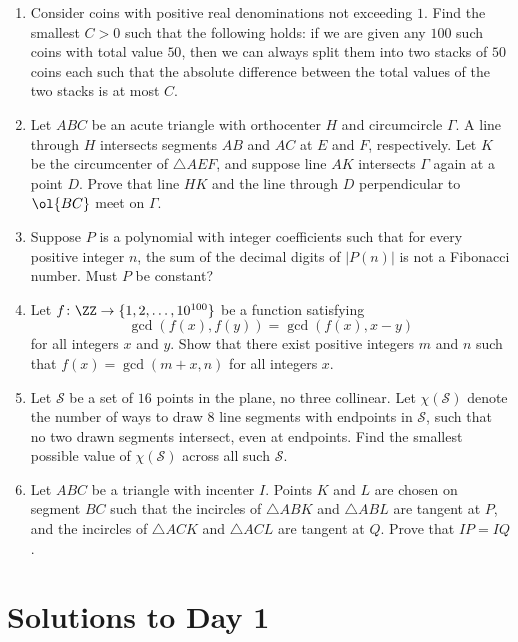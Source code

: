 \documentclass[11pt]{scrartcl}
\begin{document}
\begin{enumerate}[\bfseries 1.]
\item %
Consider coins with positive real denominations not exceeding $1$.
Find the smallest $C>0$ such that the following holds:
if we are given any $100$ such coins
with total value $50$, then we can
always split them into two stacks
of $50$ coins each such that the absolute difference
between the total values of the two stacks is at most $C$.

\item %
Let $ABC$ be an acute triangle with orthocenter $H$ and circumcircle $\Gamma$.
A line through $H$ intersects segments $AB$ and $AC$ at $E$ and $F$, respectively.
Let $K$ be the circumcenter of $\triangle AEF$,
and suppose line $AK$ intersects $\Gamma$ again at a point $D$.
Prove that line $HK$ and the line through $D$
perpendicular to $\ol{BC}$ meet on $\Gamma$.

\item %
Suppose $P$ is a polynomial with integer coefficients
such that for every positive integer $n$,
the sum of the decimal digits of $|P(n)|$
is not a Fibonacci number.
Must $P$ be constant?

\item %
Let $f \colon \ZZ \to \{1, 2, \dots, 10^{100}\}$
be a function satisfying
\[ \gcd(f(x), f(y)) = \gcd(f(x), x-y) \]
for all integers $x$ and $y$.
Show that there exist positive integers $m$ and $n$ such that
$f(x) = \gcd(m + x, n)$ for all integers $x$.

\item %
Let $\mathcal{S}$ be a set of $16$ points in the plane, no three collinear.
Let $\chi(\mathcal{S})$ denote the number of ways to
draw $8$ line segments with endpoints in $\mathcal{S}$,
such that no two drawn segments intersect, even at endpoints.
Find the smallest possible value of $\chi(\mathcal{S})$
across all such $\mathcal{S}$.

\item %
Let $ABC$ be a triangle with incenter $I$.
Points $K$ and $L$ are chosen on segment $BC$
such that the incircles of $\triangle ABK$ and $\triangle ABL$ are tangent at $P$,
and the incircles of $\triangle ACK$ and $\triangle ACL$ are tangent at $Q$.
Prove that $IP = IQ$.

\end{enumerate}
\pagebreak

\section{Solutions to Day 1}
\end{document}
